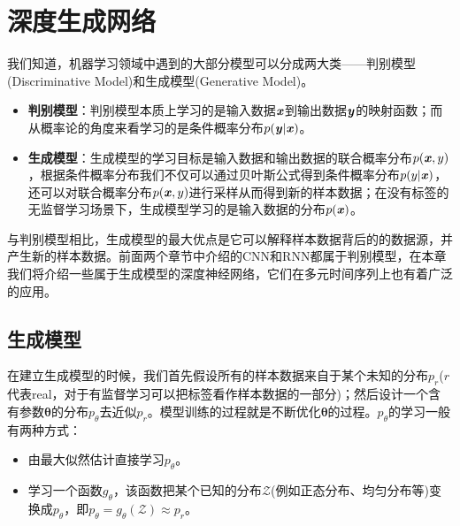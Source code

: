 
\clearpage


\chapter{深度生成网络}
我们知道，机器学习领域中遇到的大部分模型可以分成两大类——判别模型(Discriminative Model)和生成模型(Generative Model)。
\begin{itemize}
	\setlength{\itemsep}{0pt}
    \setlength{\parsep}{0pt}
    \setlength{\parskip}{0pt}
	\item \textbf{判别模型}：判别模型本质上学习的是输入数据$\boldsymbol{\mathit{x}}$到输出数据$\boldsymbol{\mathit{y}}$的映射函数；而从概率论的角度来看学习的是条件概率分布$p(\boldsymbol{\mathit{y}}|\boldsymbol{\mathit{x}})$。
	\item \textbf{生成模型}：生成模型的学习目标是输入数据和输出数据的联合概率分布$p(\boldsymbol{\mathit{x}},y)$，根据条件概率分布我们不仅可以通过贝叶斯公式得到条件概率分布$p(y|\boldsymbol{\mathit{x}})$，还可以对联合概率分布$p(\boldsymbol{\mathit{x}},y)$进行采样从而得到新的样本数据；在没有标签的无监督学习场景下，生成模型学习的是输入数据的分布$p(\boldsymbol{\mathit{x}})$。
\end{itemize}
与判别模型相比，生成模型的最大优点是它可以解释样本数据背后的的数据源，并产生新的样本数据。前面两个章节中介绍的CNN和RNN都属于判别模型，在本章我们将介绍一些属于生成模型的深度神经网络，它们在多元时间序列上也有着广泛的应用。


\section{生成模型}
在建立生成模型的时候，我们首先假设所有的样本数据来自于某个未知的分布$p_{r}$($r$代表real，对于有监督学习可以把标签看作样本数据的一部分)；然后设计一个含有参数$\bm{\theta}$的分布$p_{\theta}$去近似$p_{r}$。模型训练的过程就是不断优化$\bm{\theta}$的过程。$p_{\theta}$的学习一般有两种方式：
\begin{itemize}
	\setlength{\itemsep}{0pt}
    \setlength{\parsep}{0pt}
    \setlength{\parskip}{0pt}
	\item 由最大似然估计直接学习$p_{\theta}$。
	\item 学习一个函数$g_{\theta}$，该函数把某个已知的分布$\mathcal{Z}$(例如正态分布、均匀分布等)变换成$p_{\theta}$，即$p_{\theta}=g_{\theta}(\mathcal{Z})\approx p_{r}$。
\end{itemize}


